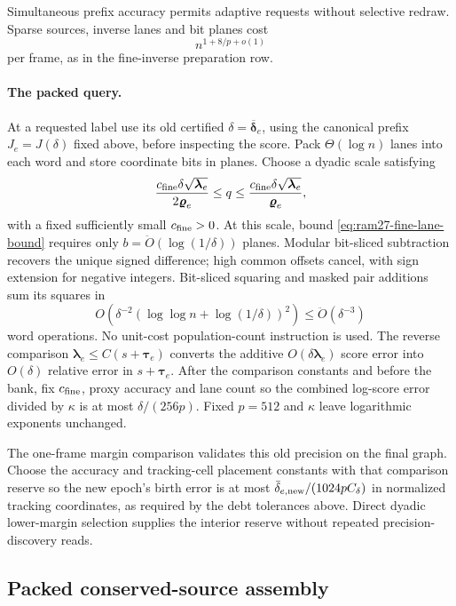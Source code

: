 \documentclass[11pt]{article}
\theoremstyle{remark}
\newcommand{\llambda}{\boldsymbol{\lambda}}
\newcommand{\ttau}{\boldsymbol{\tau}}
\newcommand{\vvr}{\boldsymbol{\varrho}}
\newcommand{\ddeltabar}{\overline{\boldsymbol{\delta}}}
\renewcommand{\O}{\ddot{O}}
\begin{document}
Simultaneous prefix accuracy permits adaptive requests without selective redraw.
Sparse sources, inverse lanes and bit planes cost
\[
 n^{1+8/p+o(1)}
\]
per frame, as in the fine-inverse preparation row.

\paragraph{The packed query.}
At a requested label use its old certified $\delta=\ddeltabar_e$, using the
canonical prefix $J_e=J(\delta)$ fixed above, before inspecting the score.
Pack $\Theta(\log n)$ lanes into each word and store coordinate bits in planes.
Choose a dyadic scale satisfying
\[
 \frac{c_{\rm fine}\delta\sqrt{\llambda_e}}{2\vvr_e}
 \le q\le
 \frac{c_{\rm fine}\delta\sqrt{\llambda_e}}{\vvr_e},
\]
with a fixed sufficiently small $c_{\rm fine}>0$.
At this scale, bound \eqref{eq:ram27-fine-lane-bound} requires only
$b=\O(\log(1/\delta))$ planes.
Modular bit-sliced subtraction recovers the unique signed difference; high
common offsets cancel, with sign extension for negative integers.
Bit-sliced squaring and masked pair additions sum its squares in
\[
 O\!\left(\delta^{-2}
              (\log\log n+\log(1/\delta))^2\right)
                      \le \O(\delta^{-3})
                                                               \tag{O8}\label{eq:ram27-packed-read-work}
\]
word operations.
No unit-cost population-count instruction is used.
The reverse comparison $\llambda_e\le C(s+\ttau_e)$ converts the additive
$O(\delta\llambda_e)$ score error into $O(\delta)$ relative error in $s+\ttau_e$.
After the comparison constants and before the bank, fix $c_{\rm fine}$, proxy
accuracy and lane count so the combined log-score error divided by $\kappa$ is
at most $\delta/(256p)$.
Fixed $p=512$ and $\kappa$ leave logarithmic exponents unchanged.

The one-frame margin comparison validates this old precision on the final graph.
Choose the accuracy and tracking-cell placement constants with that comparison
reserve so the new epoch's birth error is at most $\bar\delta_{e,\rm
new}/(1024pC_\delta)$ in normalized tracking coordinates, as required by the
debt tolerances above.
Direct dyadic lower-margin selection supplies the interior reserve without
repeated precision-discovery reads.

\subsection{Packed conserved-source assembly}
\end{document}
